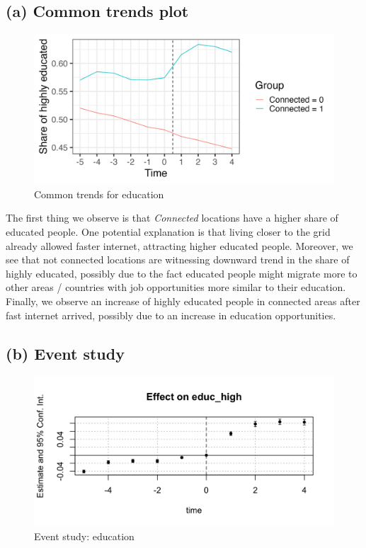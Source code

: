 \documentclass{scrartcl}
\begin{document}
\subsection*{(a) Common trends plot}

\begin{figure}[h!]
    \centering
    \includegraphics[width=0.75\linewidth]{output/figures/2_common_trends.png}
    \caption{Common trends for education}
    \label{fig:commontrends}
\end{figure}

The first thing we observe is that \textit{Connected} locations have a higher share of educated people. One potential explanation is that living closer to the grid already allowed faster internet, attracting higher educated people. Moreover, we see that not connected locations are witnessing downward trend in the share of highly educated, possibly due to the fact educated people might migrate more to other areas / countries with job opportunities more similar to their education. Finally, we observe an increase of highly educated people in connected areas after fast internet arrived, possibly due to an increase in education opportunities.  

\subsection*{(b) Event study}

\begin{figure}[h!]
    \centering
    \includegraphics[width=0.75\linewidth]{output/figures/2_event_study.png}
    \caption{Event study: education}
    \label{fig:eventstudy}
\end{figure}
\end{document}
